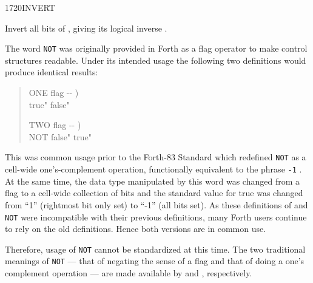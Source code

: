\begin{worddef}{1720}{INVERT}
\item {}

	Invert all bits of , giving its logical inverse
	.


	\begin{rationale} %
		The word \texttt{NOT} was originally provided in Forth as a
		flag operator to make control structures readable. Under its
		intended usage the following two definitions would produce
		identical results:

		\begin{quote}\ttfamily
			\word{:} ONE  flag -{}- ) \\
			\tab {}
					 true"
					 false"
			\word{;}

			\word{:} TWO  flag -{}- ) \\
			\tab NOT 
					 false"
					 true"
			\word{;}
		\end{quote}

		This was common usage prior to the Forth-83 Standard which
		redefined \texttt{NOT} as a cell-wide one's-complement
		operation, functionally equivalent to the phrase \texttt{-1}
		. At the same time, the data type manipulated by
		this word was changed from a flag to a cell-wide collection of
		bits and the standard value for true was changed from ``1''
		(rightmost bit only set) to ``-1'' (all bits set). As these
		definitions of  and \texttt{NOT} were incompatible
		with their previous definitions, many Forth users continue to
		rely on the old definitions. Hence both versions are in common
		use.

		Therefore, usage of \texttt{NOT} cannot be standardized at
		this time. The two traditional meanings of \texttt{NOT} ---
		that of negating the sense of a flag and that of doing a one's
		complement operation --- are made available by  and
		, respectively.
	\end{rationale}

	\begin{testing} %
		 \\
		 \\
	\end{testing}
\end{worddef}


